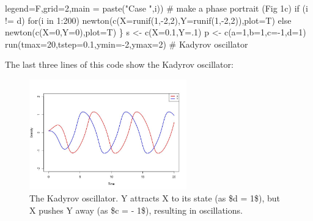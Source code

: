 \documentclass[
  letterpaper,
]{scrbook}
\newenvironment{Shaded}{\begin{snugshade}}{\end{snugshade}}
\newcommand{\AttributeTok}[1]{\textcolor[rgb]{0.40,0.45,0.13}{#1}}
\newcommand{\CommentTok}[1]{\textcolor[rgb]{0.37,0.37,0.37}{#1}}
\newcommand{\ControlFlowTok}[1]{\textcolor[rgb]{0.00,0.23,0.31}{#1}}
\newcommand{\DecValTok}[1]{\textcolor[rgb]{0.68,0.00,0.00}{#1}}
\newcommand{\FloatTok}[1]{\textcolor[rgb]{0.68,0.00,0.00}{#1}}
\newcommand{\FunctionTok}[1]{\textcolor[rgb]{0.28,0.35,0.67}{#1}}
\newcommand{\NormalTok}[1]{\textcolor[rgb]{0.00,0.23,0.31}{#1}}
\newcommand{\OtherTok}[1]{\textcolor[rgb]{0.00,0.23,0.31}{#1}}
\newcommand{\SpecialCharTok}[1]{\textcolor[rgb]{0.37,0.37,0.37}{#1}}
\newcommand{\StringTok}[1]{\textcolor[rgb]{0.13,0.47,0.30}{#1}}
\begin{document}
\begin{Shaded}
\begin{Highlighting}[]
        \AttributeTok{legend=}\NormalTok{F,}\AttributeTok{grid=}\DecValTok{2}\NormalTok{,}\AttributeTok{main =} \FunctionTok{paste}\NormalTok{(}\StringTok{"Case "}\NormalTok{,i)) }\CommentTok{\# make a phase portrait (Fig 1c)}
  \ControlFlowTok{if}\NormalTok{ (i }\SpecialCharTok{!=} \StringTok{\textquotesingle{}d\textquotesingle{}}\NormalTok{) }\ControlFlowTok{for}\NormalTok{(i }\ControlFlowTok{in} \DecValTok{1}\SpecialCharTok{:}\DecValTok{200}\NormalTok{) }\FunctionTok{newton}\NormalTok{(}\FunctionTok{c}\NormalTok{(}\AttributeTok{X=}\FunctionTok{runif}\NormalTok{(}\DecValTok{1}\NormalTok{,}\SpecialCharTok{{-}}\DecValTok{2}\NormalTok{,}\DecValTok{2}\NormalTok{),}\AttributeTok{Y=}\FunctionTok{runif}\NormalTok{(}\DecValTok{1}\NormalTok{,}\SpecialCharTok{{-}}\DecValTok{2}\NormalTok{,}\DecValTok{2}\NormalTok{)),}\AttributeTok{plot=}\NormalTok{T) }\ControlFlowTok{else}
    \FunctionTok{newton}\NormalTok{(}\FunctionTok{c}\NormalTok{(}\AttributeTok{X=}\DecValTok{0}\NormalTok{,}\AttributeTok{Y=}\DecValTok{0}\NormalTok{),}\AttributeTok{plot=}\NormalTok{T)}
\NormalTok{\}}
\NormalTok{s }\OtherTok{\textless{}{-}} \FunctionTok{c}\NormalTok{(}\AttributeTok{X=}\FloatTok{0.1}\NormalTok{,}\AttributeTok{Y=}\NormalTok{.}\DecValTok{1}\NormalTok{) }
\NormalTok{p }\OtherTok{\textless{}{-}} \FunctionTok{c}\NormalTok{(}\AttributeTok{a=}\DecValTok{1}\NormalTok{,}\AttributeTok{b=}\DecValTok{1}\NormalTok{,}\AttributeTok{c=}\SpecialCharTok{{-}}\DecValTok{1}\NormalTok{,}\AttributeTok{d=}\DecValTok{1}\NormalTok{)}
\FunctionTok{run}\NormalTok{(}\AttributeTok{tmax=}\DecValTok{20}\NormalTok{,}\AttributeTok{tstep=}\FloatTok{0.1}\NormalTok{,}\AttributeTok{ymin=}\SpecialCharTok{{-}}\DecValTok{2}\NormalTok{,}\AttributeTok{ymax=}\DecValTok{2}\NormalTok{) }\CommentTok{\# Kadyrov oscillator}
\end{Highlighting}
\end{Shaded}

The last three lines of this code show the Kadyrov oscillator:

\begin{figure}

{\centering \includegraphics[width=2.67444in,height=\textheight]{media/ch5/image17.jpg}

}

\caption{\label{fig-ch5-img17-old-65}The Kadyrov oscillator. Y attracts
X to its state (as \$d = 1\$), but X pushes Y away (as \$c = - 1\$),
resulting in oscillations.}

\end{figure}
\end{document}
